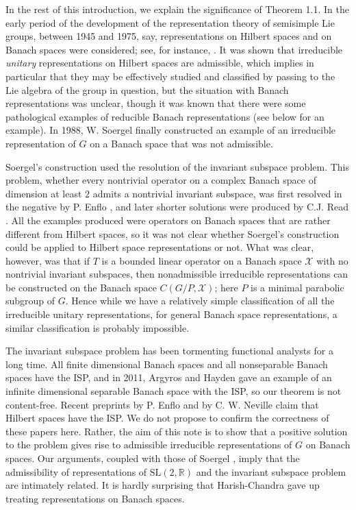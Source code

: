 \documentclass[12pt,a4paper]{amsart}
\theoremstyle{definition}
\theoremstyle{remark}
\numberwithin{equation}{section}
\newcommand{\R}{\mathbb{R}}
\newcommand{\Ban}{\mathcal{X}}
\begin{document}
In the rest of this introduction, we explain the significance of Theorem 1.1.
In the early period of the development of the representation theory of semisimple Lie groups, between 1945 and 1975, say, representations on Hilbert spaces and on Banach spaces were considered; see, for instance, \cite[Chap 4]{War}.
It was shown that irreducible \emph{unitary} representations on Hilbert spaces are admissible, which implies in particular that they may be effectively studied and classified by passing to the Lie algebra of the group in question, but the situation with Banach representations was unclear, though it was known that there were some pathological examples of reducible Banach representations (see below for an example).
In 1988, W. Soergel \cite{Soergel88} finally constructed an example of an irreducible representation of $G$ on a Banach space that was not admissible.

Soergel's construction used the resolution of the invariant subspace problem.
This problem, whether every nontrivial operator on a complex Banach space of dimension at least $2$ admits a nontrivial invariant subspace, was first resolved in the negative by P. Enflo \cite{Enflo1}, and later shorter solutions were produced by C.J. Read \cite{Read1, Read2}.
All the examples produced were operators on Banach spaces that are rather different from Hilbert spaces, so it was not clear whether Soergel's construction could be applied to Hilbert space representations or not.
What was clear, however, was that if $T$ is a bounded linear operator on a Banach space $\Ban$ with no nontrivial invariant subspaces, then nonadmissible irreducible representations can be constructed on the Banach space $C(G/P,\Ban)$; here $P$ is a minimal parabolic subgroup of $G$.
Hence while we have a relatively simple classification of all the irreducible unitary representations, for general Banach space representations, a similar classification is probably impossible.

The invariant subspace problem has been tormenting functional analysts for a long time.
All finite dimensional Banach spaces and all nonseparable Banach spaces have the ISP,  and in 2011, Argyros and Hayden \cite{AH} gave an example of an infinite dimensional separable  Banach space with the ISP, so our theorem is not content-free.
Recent  preprints by P. Enflo \cite{Enflo2} and by C. W. Neville \cite{Neville} claim that Hilbert spaces have the ISP.
We do not propose to confirm the correctness of these papers here.
Rather, the aim of this note is to show that a positive solution to the problem gives rise to admissible irreducible representations of $G$ on Banach spaces.
Our arguments, coupled with those of Soergel \cite{Soergel88}, imply that the admissibility of representations of $\mathrm{SL}(2,\R)$ and  the invariant subspace problem are intimately related.
It is hardly surprising that Harish-Chandra gave up treating representations on Banach spaces.
\color{black}
\end{document}
